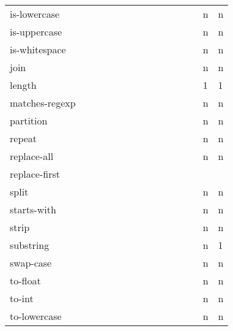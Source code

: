 \documentclass[anonymous,sigplan,review,11pt,nonacm,natbib=false]{acmart}
\begin{document}
\begin{table*}
\begin{tabular}{lllllllllllllll}
            is-lowercase &  &  &  &  &  &  &  &  &  &  &  &  & n & n \\

            is-uppercase &  &  &  &  &  &  &  &  &  &  &  &  & n & n \\

            is-whitespace &  &  &  &  &  &  &  &  &  &  &  &  & n & n \\

            join &  &  &  &  &  &  &  &  &  &  &  &  & n & n \\

            length &  &  &  &  &  &  &  &  &  &  &  &  & 1 & 1 \\

            matches-regexp &  &  &  &  &  &  &  &  &  &  &  &  & n & n \\

            partition &  &  &  &  &  &  &  &  &  &  &  &  & n & n \\

            repeat &  &  &  &  &  &  &  &  &  &  &  &  & n & n \\

            replace-all &  &  &  &  &  &  &  &  &  &  &  &  & n & n \\

            replace-first &  &  &  &  &  &  &  &  &  &   &  &  &  & \\

            split &  &  &  &  &  &  &  &  &  &  &  &  & n & n \\

            starts-with &  &  &  &  &  &  &  &  &  &  &  &  & n & n \\

            strip &  &  &  &  &  &  &  &  &  &  &  &  & n & n \\

            substring &  &  &  &  &  &  &  &  &  &  &  &  & n & 1 \\

            swap-case &  &  &  &  &  &  &  &  &  &  &  &  & n & n \\

            to-float &  &  &  &  &  &  &  &  &  &  &  &  & n & n \\

            to-int &  &  &  &  &  &  &  &  &  &  &  &  & n & n \\

            to-lowercase &  &  &  &  &  &  &  &  &  &  &  &  & n & n \\


\end{tabular}
\end{table*}
\end{document}
